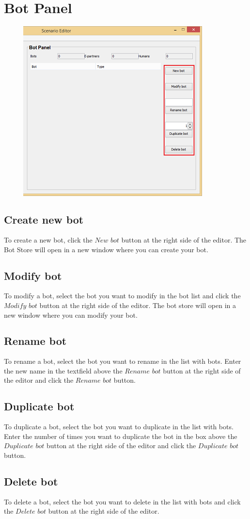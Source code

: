 \documentclass[a4paper]{article}
\begin{document}
\section{Bot Panel}
\begin{figure}
\includegraphics{bot.png}
\end{figure}
\subsection{Create new bot}
To create a new bot, click the $New$ $bot$ button at the right side of the editor. The Bot Store will open in a new window where you can create your bot.

\subsection{Modify bot}
To modify a bot, select the bot you want to modify in the bot list and click the $Modify$ $bot$ button at the right side of the editor. The bot store will open in a new window where you can modify your bot.

\subsection{Rename bot}
To rename a bot, select the bot you want to rename in the list with bots. Enter the new name in the textfield above the $Rename$ $bot$ button at the right side of the editor and click the $Rename$ $bot$ button.

\subsection{Duplicate bot}
To duplicate a bot, select the bot you want to duplicate in the list with bots. Enter the number of times you want to duplicate the bot in the box above the $Duplicate$ $bot$ button at the right side of the editor and click the $Duplicate$ $bot$ button.

\subsection{Delete bot}
To delete a bot, select the bot you want to delete in the list with bots and click the $Delete$ $bot$ button at the right side of the editor.
\end{document}
